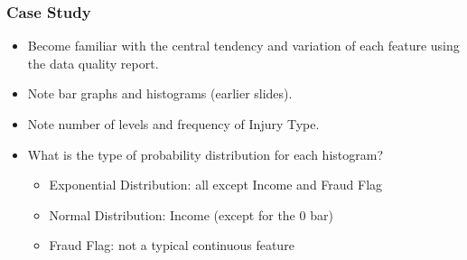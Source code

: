 \begin{frame}[fragile] \frametitle{Case Study}
\begin{itemize}
\item Become familiar with the central tendency and variation of each feature using the data quality report.
\item Note bar graphs and histograms (earlier slides).
\item Note number of levels and frequency of Injury Type.
\item What is the type of probability distribution for each histogram?
	\begin{itemize}
	\item Exponential Distribution: all except Income and Fraud Flag
	\item Normal Distribution: Income (except for the 0 bar)
	\item Fraud Flag: not a typical continuous feature
	\end{itemize}
\end{itemize}
\end{frame}

